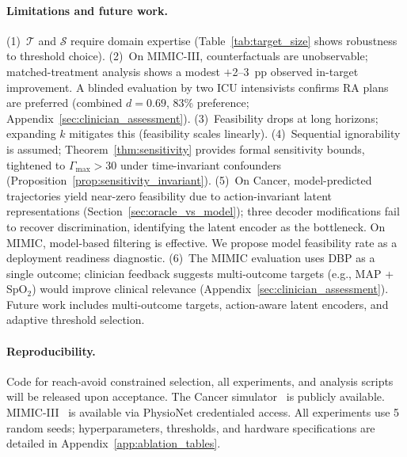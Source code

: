 \documentclass{article}
\newcommand{\cT}{\mathcal{T}}
\newcommand{\cS}{\mathcal{S}}
\begin{document}
\vspace{-0.8em}
\paragraph{Limitations and future work.} (1)~$\cT$ and $\cS$ require domain expertise (Table~\ref{tab:target_size} shows robustness to threshold choice). (2)~On MIMIC-III, counterfactuals are unobservable; matched-treatment analysis shows a modest $+$2--3~pp observed in-target improvement. A blinded evaluation by two ICU intensivists confirms RA plans are preferred (combined $d = 0.69$, 83\% preference; Appendix~\ref{sec:clinician_assessment}). (3)~Feasibility drops at long horizons; expanding $k$ mitigates this (feasibility scales linearly). (4)~Sequential ignorability is assumed; Theorem~\ref{thm:sensitivity} provides formal sensitivity bounds, tightened to $\Gamma_{\max} > 30$ under time-invariant confounders (Proposition~\ref{prop:sensitivity_invariant}). (5)~On Cancer, model-predicted trajectories yield near-zero feasibility due to action-invariant latent representations (Section~\ref{sec:oracle_vs_model}); three decoder modifications fail to recover discrimination, identifying the latent encoder as the bottleneck. On MIMIC, model-based filtering is effective. We propose model feasibility rate as a deployment readiness diagnostic. (6)~The MIMIC evaluation uses DBP as a single outcome; clinician feedback suggests multi-outcome targets (e.g., MAP + SpO$_2$) would improve clinical relevance (Appendix~\ref{sec:clinician_assessment}). Future work includes multi-outcome targets, action-aware latent encoders, and adaptive threshold selection.

\vspace{-0.8em}
\paragraph{Reproducibility.} Code for reach-avoid constrained selection, all experiments, and analysis scripts will be released upon acceptance. The Cancer simulator~\citep{bica2020cancer} is publicly available. MIMIC-III~\citep{johnson2016mimic} is available via PhysioNet credentialed access. All experiments use 5 random seeds; hyperparameters, thresholds, and hardware specifications are detailed in Appendix~\ref{app:ablation_tables}.






\end{document}

